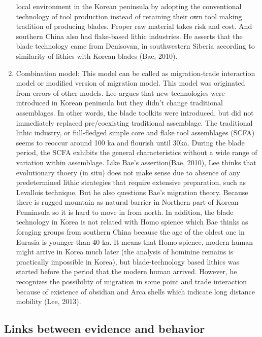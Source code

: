 \documentclass[american,man]{apa6}
\begin{document}
\begin{enumerate}
  local environment in the Korean peninsula by adopting the conventional
  technology of tool production instead of retaining their own tool
  making tradition of producing blades. Proper raw material takes risk
  and cost. And southern China also had flake-based lithic industries.
  He asserts that the blade technology came from Denisovan, in
  southwestern Siberia according to similarity of lithics with Korean
  blades (Bae, 2010).
\item
  Combination model: This model can be called as migration-trade
  interaction model or modified version of migration model. This model
  was originated from errors of other models. Lee argues that new
  technologies were introduced in Korean peninsula but they didn't
  change traditional assemblages. In other words, the blade toolkits
  were introduced, but did not immediately replaced pre/coexisting
  traditional assemblage. The traditional lithic industry, or
  full-fledged simple core and flake tool assemblages (SCFA) seems to
  reoccur around 100 ka and flourish until 30ka. During the blade
  period, the SCFA exhibits the general characteristics without a wide
  range of variation within assemblage. Like Bae's assertion(Bae, 2010),
  Lee thinks that evolutionary thoery (in situ) does not make sense due
  to absence of any predetermined lithic strategies that require
  extensive preparation, such as Levallois technique. But he also
  questions Bae's migration theory. Because there is rugged mountain as
  natural barrier in Northern part of Korean Penninsula so it is hard to
  move in from north. In addition, the blade technology in Korea is not
  related with Homo spience which Bae thinks as foraging groups from
  southern China because the age of the oldest one in Eurasia is younger
  than 40 ka. It means that Homo spience, modern human might arrive in
  Korea much later (the analysis of hominine remains is practically
  impossible in Korea), but blade-technology based lithics was started
  before the period that the modern human arrived. However, he
  recognizes the possibility of migration in some point and trade
  interaction because of existence of obsidian and Arca shells which
  indicate long distance mobility (Lee, 2013).
\end{enumerate}

\subsection{Links between evidence and
behavior}\label{links-between-evidence-and-behavior}
\end{document}
